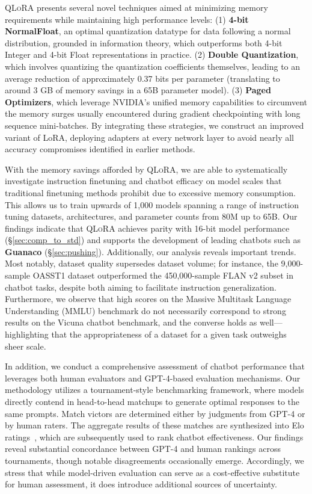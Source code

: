 \textsc{QLoRA} presents several novel techniques aimed at minimizing memory requirements while maintaining high performance levels: (1) \textbf{4-bit NormalFloat}, an optimal quantization datatype for data following a normal distribution, grounded in information theory, which outperforms both 4-bit Integer and 4-bit Float representations in practice. (2) \textbf{Double Quantization}, which involves quantizing the quantization coefficients themselves, leading to an average reduction of approximately 0.37 bits per parameter (translating to around 3 GB of memory savings in a 65B parameter model). (3) \textbf{Paged Optimizers}, which leverage NVIDIA's unified memory capabilities to circumvent the memory surges usually encountered during gradient checkpointing with long sequence mini-batches. By integrating these strategies, we construct an improved variant of LoRA, deploying adapters at every network layer to avoid nearly all accuracy compromises identified in earlier methods.

With the memory savings afforded by \textsc{QLoRA}, we are able to systematically investigate instruction finetuning and chatbot efficacy on model scales that traditional finetuning methods prohibit due to excessive memory consumption. This allows us to train upwards of 1,000 models spanning a range of instruction tuning datasets, architectures, and parameter counts from 80M up to 65B. Our findings indicate that \textsc{QLoRA} achieves parity with 16-bit model performance (\S\ref{sec:comp_to_std}) and supports the development of leading chatbots such as \textbf{Guanaco} (\S\ref{sec:pushing}). Additionally, our analysis reveals important trends. Most notably, dataset quality supersedes dataset volume; for instance, the 9,000-sample OASST1 dataset outperformed the 450,000-sample FLAN v2 subset in chatbot tasks, despite both aiming to facilitate instruction generalization. Furthermore, we observe that high scores on the Massive Multitask Language Understanding (MMLU) benchmark do not necessarily correspond to strong results on the Vicuna chatbot benchmark, and the converse holds as well—highlighting that the appropriateness of a dataset for a given task outweighs sheer scale.

In addition, we conduct a comprehensive assessment of chatbot performance that leverages both human evaluators and GPT-4-based evaluation mechanisms. Our methodology utilizes a tournament-style benchmarking framework, where models directly contend in head-to-head matchups to generate optimal responses to the same prompts. Match victors are determined either by judgments from GPT-4 or by human raters. The aggregate results of these matches are synthesized into Elo ratings~\citep{elo1967proposed, elo1978rating}, which are subsequently used to rank chatbot effectiveness. Our findings reveal substantial concordance between GPT-4 and human rankings across tournaments, though notable disagreements occasionally emerge. Accordingly, we stress that while model-driven evaluation can serve as a cost-effective substitute for human assessment, it does introduce additional sources of uncertainty.

